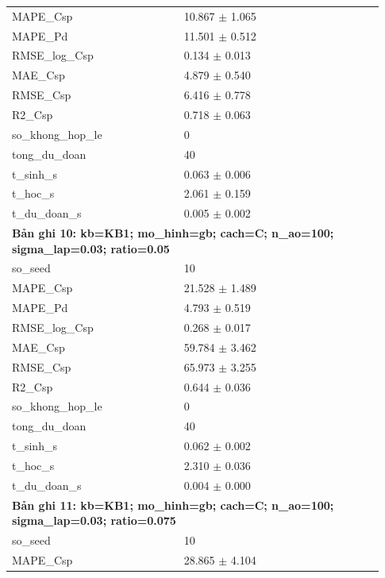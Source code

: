 \begin{longtable}{p{0.43\linewidth}p{0.50\linewidth}}
MAPE\_\allowbreak Csp & 10.867 $\pm$ 1.065 \\
MAPE\_\allowbreak Pd & 11.501 $\pm$ 0.512 \\
RMSE\_\allowbreak log\_\allowbreak Csp & 0.134 $\pm$ 0.013 \\
MAE\_\allowbreak Csp & 4.879 $\pm$ 0.540 \\
RMSE\_\allowbreak Csp & 6.416 $\pm$ 0.778 \\
R2\_\allowbreak Csp & 0.718 $\pm$ 0.063 \\
so\_\allowbreak khong\_\allowbreak hop\_\allowbreak le & 0 \\
tong\_\allowbreak du\_\allowbreak doan & 40 \\
t\_\allowbreak sinh\_\allowbreak s & 0.063 $\pm$ 0.006 \\
t\_\allowbreak hoc\_\allowbreak s & 2.061 $\pm$ 0.159 \\
t\_\allowbreak du\_\allowbreak doan\_\allowbreak s & 0.005 $\pm$ 0.002 \\
\midrule
\multicolumn{2}{p{0.95\linewidth}}{\textbf{Bản ghi 10: kb=KB1; mo\_hinh=gb; cach=C; n\_ao=100; sigma\_lap=0.03; ratio=0.05}} \\
so\_\allowbreak seed & 10 \\
MAPE\_\allowbreak Csp & 21.528 $\pm$ 1.489 \\
MAPE\_\allowbreak Pd & 4.793 $\pm$ 0.519 \\
RMSE\_\allowbreak log\_\allowbreak Csp & 0.268 $\pm$ 0.017 \\
MAE\_\allowbreak Csp & 59.784 $\pm$ 3.462 \\
RMSE\_\allowbreak Csp & 65.973 $\pm$ 3.255 \\
R2\_\allowbreak Csp & 0.644 $\pm$ 0.036 \\
so\_\allowbreak khong\_\allowbreak hop\_\allowbreak le & 0 \\
tong\_\allowbreak du\_\allowbreak doan & 40 \\
t\_\allowbreak sinh\_\allowbreak s & 0.062 $\pm$ 0.002 \\
t\_\allowbreak hoc\_\allowbreak s & 2.310 $\pm$ 0.036 \\
t\_\allowbreak du\_\allowbreak doan\_\allowbreak s & 0.004 $\pm$ 0.000 \\
\midrule
\multicolumn{2}{p{0.95\linewidth}}{\textbf{Bản ghi 11: kb=KB1; mo\_hinh=gb; cach=C; n\_ao=100; sigma\_lap=0.03; ratio=0.075}} \\
so\_\allowbreak seed & 10 \\
MAPE\_\allowbreak Csp & 28.865 $\pm$ 4.104 \\

\end{longtable}
